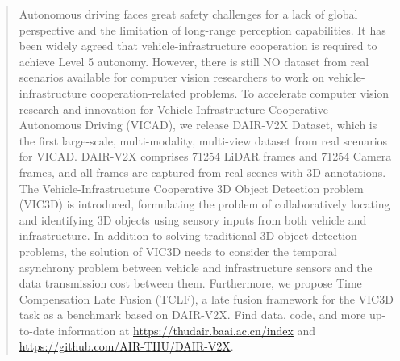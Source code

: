 \documentclass[10pt,twocolumn,letterpaper]{article}
\begin{document}
\begin{abstract}
Autonomous driving faces great safety challenges for a lack of global perspective and the limitation of long-range perception capabilities. 
It has been widely agreed that vehicle-infrastructure cooperation is required to achieve Level 5 autonomy. 
However, there is still NO dataset from real scenarios available for computer vision researchers to work on vehicle-infrastructure cooperation-related problems. To accelerate computer vision research and innovation for Vehicle-Infrastructure Cooperative Autonomous Driving (VICAD), we release DAIR-V2X Dataset, which is the first large-scale, multi-modality, multi-view dataset from real scenarios for VICAD. 
DAIR-V2X comprises 71254 LiDAR frames and 71254 Camera frames, and all frames are captured from real scenes with 3D annotations.
The Vehicle-Infrastructure Cooperative 3D Object Detection problem (VIC3D) is introduced, formulating the problem of collaboratively locating and identifying 3D objects using sensory inputs from both vehicle and infrastructure. 
In addition to solving traditional 3D object detection problems, the solution of VIC3D needs to consider the temporal asynchrony problem between vehicle and infrastructure sensors and the data transmission cost between them. 
Furthermore, we propose Time Compensation Late Fusion (TCLF), a late fusion framework for the VIC3D task as a benchmark based on DAIR-V2X.
Find data, code, and more up-to-date information
at \href{https://thudair.baai.ac.cn/index}{https://thudair.baai.ac.cn/index} and \href{https://github.com/AIR-THU/DAIR-V2X}{https://github.com/AIR-THU/DAIR-V2X}.
\end{abstract}







\end{document}
